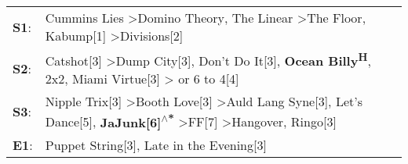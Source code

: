\begin{supertabular}{p{0.03\textwidth}p{0.92\textwidth}}
 \textbf{S1}:  &                                                                                                                 Cummins Lies\textsuperscript{} \textgreater \enspace Domino Theory\textsuperscript{}, \enspace The Linear\textsuperscript{} \textgreater \enspace The Floor\textsuperscript{}, \enspace Kabump[1]\textsuperscript{} \textgreater \enspace Divisions[2]\textsuperscript{}  \enspace  \\
 \textbf{S2}:  &                                                                       Catshot[3]\textsuperscript{} \textgreater \enspace Dump City[3]\textsuperscript{}, \enspace Don't Do It[3]\textsuperscript{}, \enspace \textbf{Ocean Billy\textsuperscript{H}}, \enspace 2x2\textsuperscript{}, \enspace Miami Virtue[3]\textsuperscript{} \textgreater {} or 6 to 4[4]\textsuperscript{}  \enspace  \\
 \textbf{S3}:  &  Nipple Trix[3]\textsuperscript{} \textgreater \enspace Booth Love[3]\textsuperscript{} \textgreater \enspace Auld Lang Syne[3]\textsuperscript{}, \enspace Let's Dance[5]\textsuperscript{}, \enspace \textbf{JaJunk[6]\textsuperscript{$\wedge$*}} \textgreater \enspace FF[7]\textsuperscript{} \textgreater \enspace Hangover\textsuperscript{}, \enspace Ringo[3]\textsuperscript{}  \enspace  \\
 \textbf{E1}:  &                                                                                                                                                                                                                                                                                                    Puppet String[3]\textsuperscript{}, \enspace Late in the Evening[3]\textsuperscript{}  \enspace  \\
\end{supertabular}
